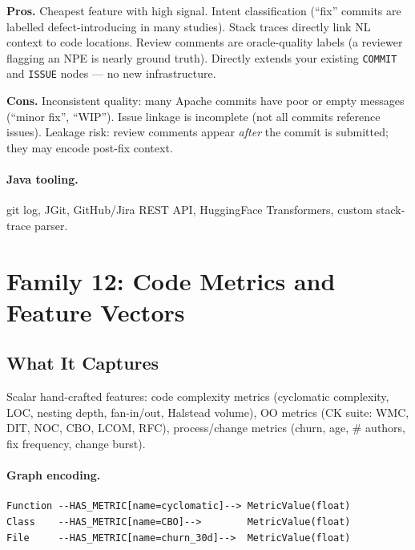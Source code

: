 \documentclass[12pt,a4paper]{article}
\begin{document}
\begin{prosbox}
\textbf{Pros.}
Cheapest feature with high signal. Intent classification (``fix'' commits
are labelled defect-introducing in many studies). Stack traces directly link
NL context to code locations. Review comments are oracle-quality labels
(a reviewer flagging an NPE is nearly ground truth). Directly extends your
existing \texttt{COMMIT} and \texttt{ISSUE} nodes --- no new infrastructure.
\end{prosbox}

\begin{consbox}
\textbf{Cons.}
Inconsistent quality: many Apache commits have poor or empty messages
(``minor fix'', ``WIP''). Issue linkage is incomplete (not all commits
reference issues). Leakage risk: review comments appear \emph{after} the
commit is submitted; they may encode post-fix context.
\end{consbox}

\paragraph{Java tooling.} git log, JGit, GitHub/Jira REST API, HuggingFace
Transformers, custom stack-trace parser.

\section{Family 12: Code Metrics and Feature Vectors}

\subsection{What It Captures}

Scalar hand-crafted features: code complexity metrics (cyclomatic complexity,
LOC, nesting depth, fan-in/out, Halstead volume), OO metrics (CK suite: WMC,
DIT, NOC, CBO, LCOM, RFC), process/change metrics (churn, age, \# authors,
fix frequency, change burst).

\paragraph{Graph encoding.}
\begin{lstlisting}
Function --HAS_METRIC[name=cyclomatic]--> MetricValue(float)
Class    --HAS_METRIC[name=CBO]-->        MetricValue(float)
File     --HAS_METRIC[name=churn_30d]-->  MetricValue(float)
\end{lstlisting}
\end{document}
